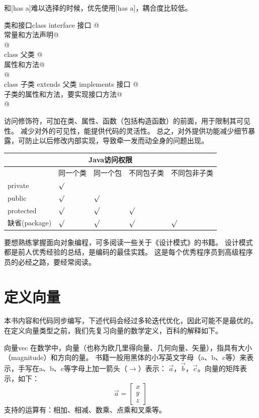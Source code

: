 \noindent
[is a]和[has a]难以选择的时候，优先使用[has a]，耦合度比较低。
\bigskip

\begin{definition}{类和接口}{class}
	\lstinline@[修饰符] interface 接口 { @ \\
	\lstinline@	常量和方法声明@ \\
	\lstinline@}@ \\
	\lstinline@[修饰符] class 父类 { @ \\
	\lstinline@	属性和方法@ \\
	\lstinline@}@ \\
	\lstinline@[修饰符] class 子类 extends 父类 implements 接口 {@ \\
	\lstinline@	子类的属性和方法，要实现接口方法@ \\
	\lstinline@}@
\end{definition}

访问修饰符，可加在类、属性、函数（包括构造函数）的前面，用于限制其可见性。
减少对外的可见性，能提供代码的灵活性。
总之，对外提供功能减少细节暴露，可防止以后修改内部实现，导致牵一发而动全身的问题出现。

\begin{table}[!htbp]\centering
	\begin{tabular}{|p{3cm}|p{1.6cm}|p{1.6cm}|p{2cm}|p{2.4cm}|}
	\toprule
	\multicolumn{5}{|c|}{Java访问权限}\\ 
	\midrule
	&同一个类&同一个包&不同包子类&不同包非子类\\ \hline
	private&$\surd$&&&\\ \hline
	public&$\surd$&$\surd$&&\\\hline
	protected&$\surd$&$\surd$&$\surd$&\\ \hline
	缺省(package)&$\surd$&$\surd$&$\surd$&$\surd$\\
	\bottomrule
	\end{tabular}
\end{table}

要想熟练掌握面向对象编程，可多阅读一些关于《设计模式》的书籍。
设计模式都是前人优秀经验的总结，是编码的最佳实践。
这是每个优秀程序员到高级程序员的必经之路，要经常阅读。

\section{定义向量}
本书内容和代码同步编写，下述代码会经过多轮迭代优化，因此可能不是最优的。
在定义向量类型之前，我们先复习向量的数学定义，百科的解释如下。

\begin{definition}{向量}{vec}
	在数学中，向量（也称为欧几里得向量、几何向量、矢量），指具有大小（magnitude）和方向的量。
	书籍一般用黑体的小写英文字母（a、b、c等）来表示，手写在a、b、c等字母上加一箭头（$\rightarrow$）表示：
	$\vec{a}$，$\vec{b}$，$\vec{c}$。向量的矩阵表示，如下：
	$$
	\vec{a} = \begin{bmatrix}x\\y\\z\end{bmatrix} 
	$$
	支持的运算有：相加、相减、数乘、点乘和叉乘等。
\end{definition}

